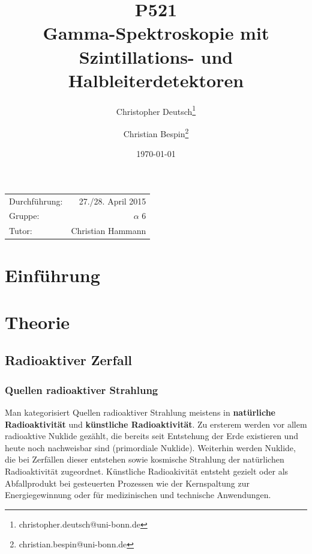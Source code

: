 \documentclass[11pt, a4paper]{article}
\title{P521 \\ Gamma-Spektroskopie mit Szintillations- und Halbleiterdetektoren}
\author{Christopher Deutsch\footnote{christopher.deutsch@uni-bonn.de} \and Christian Bespin\footnote{christian.bespin@uni-bonn.de}}
\date{\today}
\numberwithin{equation}{section}
\begin{document}
\begin{titlepage}

\maketitle

\begin{center}
\begin{tabular}{l r}
Durchführung: & 27./28. April 2015 \\
Gruppe: & $\alpha$ 6 \\
Tutor: & Christian Hammann
\end{tabular}
\end{center}

\begin{abstract}
\noindent

\end{abstract}

\end{titlepage}

\tableofcontents
\newpage


\section{Einführung}

\section{Theorie}

\subsection{Radioaktiver Zerfall}

\subsubsection{Quellen radioaktiver Strahlung}
\label{sssec:quellen_radioaktivität}
Man kategorisiert Quellen radioaktiver Strahlung meistens in \textbf{natürliche Radioaktivität} und \textbf{künstliche Radioaktivität}.
Zu ersterem werden vor allem radioaktive Nuklide gezählt, die bereits seit Entstehung der Erde existieren und heute noch nachweisbar sind (primordiale Nuklide).
Weiterhin werden Nuklide, die bei Zerfällen dieser entstehen sowie kosmische Strahlung der natürlichen Radioaktivität zugeordnet.
Künstliche Radioakivität entsteht gezielt oder als Abfallprodukt bei gesteuerten Prozessen wie der Kernspaltung zur Energiegewinnung oder für medizinischen und technische Anwendungen.
\end{document}
